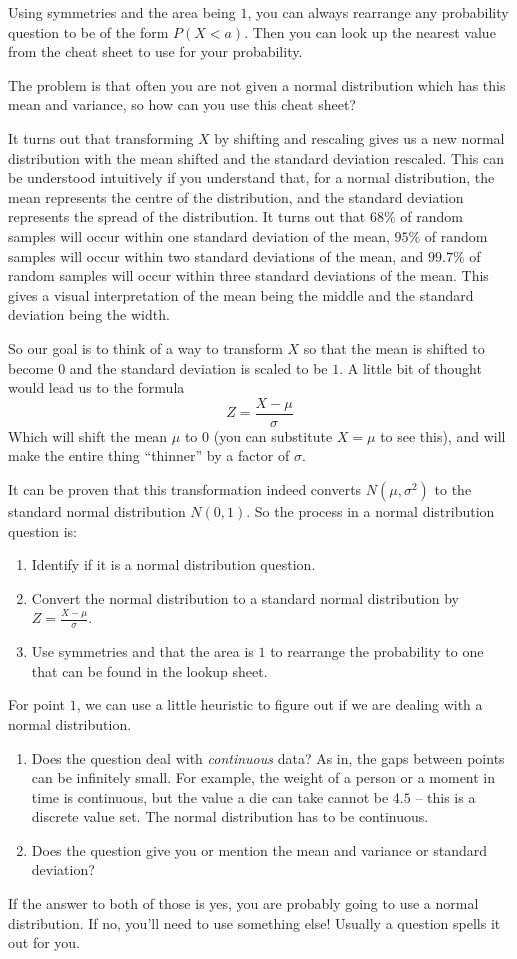 Using symmetries and the area being $1$, you can always rearrange any probability question to be of the form $P(X<a)$. Then you can look up the nearest 
value from the cheat sheet to use for your probability. 

The problem is that often you are not given a normal distribution which has this mean and variance, so how can you use this cheat sheet?

It turns out that transforming $X$ by shifting and rescaling gives us a new normal distribution with the mean shifted and the standard deviation rescaled. 
This can be understood intuitively if you understand that, for a normal distribution, the mean represents the centre of the distribution, and the standard deviation represents the spread of the 
distribution. 
It turns out that $68\%$ of random samples will occur within one standard deviation of the mean, 
$95\%$ of random samples will occur within two standard deviations of the mean, and
$99.7\%$ of random samples will occur within three standard deviations of the mean. 
This gives a visual interpretation of the mean being the middle and the standard deviation being the width.

So our goal is to think 
of a way to transform $X$ so that the mean is shifted to become $0$ and the standard deviation is scaled to be $1$. 
A little bit of thought would lead us to the formula 
\[Z = \frac{X-\mu}{\sigma}\]
Which will shift the mean $\mu$ to $0$ (you can substitute $X=\mu$ to see this), and will make the entire thing ``thinner'' by a factor of $\sigma$. 

It can be proven that this transformation indeed converts $N(\mu,\sigma^2)$ to the standard normal distribution $N(0,1)$. 
So the process in a normal distribution question is:
\begin{enumerate}
    \item Identify if it is a normal distribution question. 
    \item Convert the normal distribution to a standard normal distribution by $Z = \frac{X-\mu}{\sigma}$.
    \item Use symmetries and that the area is $1$ to rearrange the probability to one that can be found in the lookup sheet.
\end{enumerate}

For point $1$, we can use a little heuristic to figure out if we are dealing with a normal distribution. 
\begin{enumerate}
    \item Does the question deal with \emph{continuous} data? As in, the gaps between points can be infinitely small. For example, the weight of a person or a moment in time is continuous, but the value a die can take cannot be $4.5$ -- this is a discrete value set. The normal distribution has to be continuous.
    \item Does the question give you or mention the mean and variance or standard deviation?
\end{enumerate} 
If the answer to both of those is yes, you are probably going to use a normal distribution. If no, you'll need to use something else! Usually a question spells it out for you.


